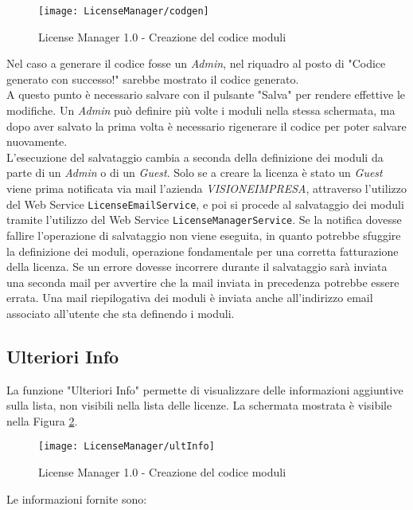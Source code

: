 \begin{figure}[!h] 
    \centering 
    \texttt{[image: LicenseManager/codgen]} 
    \caption{License Manager 1.0 - Creazione del codice moduli}
\label{codcreat}
\end{figure}

Nel caso a generare il codice fosse un \textit{Admin}, nel riquadro al posto di "Codice generato con successo!" sarebbe mostrato il codice generato.
\\
A questo punto è necessario salvare con il pulsante "Salva" per rendere effettive le modifiche.
Un \textit{Admin} può definire più volte i moduli nella stessa schermata, ma dopo aver salvato la prima volta è necessario rigenerare il codice per poter salvare nuovamente.\\
L’esecuzione del salvataggio cambia a seconda della definizione dei moduli da parte di un \textit{Admin} o di un \textit{Guest}.
Solo se a creare la licenza è stato un \textit{Guest} viene prima notificata via mail l'azienda \textit{VISIONEIMPRESA}, attraverso l'utilizzo del Web Service \texttt{LicenseEmailService}, e poi si procede al salvataggio dei moduli tramite l'utilizzo del Web Service \texttt{LicenseManagerService}. Se la notifica dovesse fallire l’operazione di salvataggio non viene eseguita, in quanto potrebbe sfuggire la definizione dei moduli, operazione fondamentale per una corretta fatturazione della licenza. Se un errore dovesse incorrere durante il salvataggio sarà inviata una seconda mail per avvertire che la mail inviata in precedenza potrebbe essere errata.
Una mail riepilogativa dei moduli è inviata anche all'indirizzo email associato all'utente che sta definendo i moduli.

\newpage

\subsection{Ulteriori Info}
La funzione "Ulteriori Info" permette di visualizzare delle informazioni aggiuntive sulla lista, non visibili nella lista delle licenze.
La schermata mostrata è visibile nella Figura \ref{info}.


\begin{figure}[!h] 
    \centering 
    \texttt{[image: LicenseManager/ultInfo]} 
    \caption{License Manager 1.0 - Creazione del codice moduli}
\label{info}
\end{figure}

Le informazioni fornite sono:

